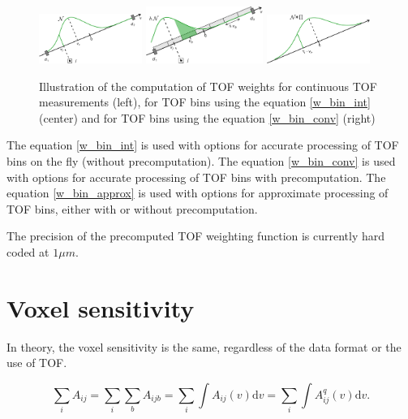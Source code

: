 \documentclass[a4paper, 11pt]{article}
\begin{document}
\begin{figure}[!htb]
\centering
\includegraphics[width=0.3\textwidth]{figures/tof_weights_illustr1.pdf}
\includegraphics[width=0.34\textwidth]{figures/tof_weights_illustr2.pdf}
\includegraphics[width=0.3\textwidth]{figures/tof_weights_illustr3.pdf}
\caption{Illustration of the computation of TOF weights for continuous TOF measurements (left), for TOF bins using the equation \ref{w_bin_int} (center) and for TOF bins using the equation \ref{w_bin_conv} (right)}
\label{illustr_var}
\end{figure}

The equation \ref{w_bin_int} is used with options for accurate processing of TOF bins on the fly (without precomputation). The equation \ref{w_bin_conv} is used with options for accurate processing of TOF bins with precomputation. The equation \ref{w_bin_approx} is used with options for approximate processing of TOF bins, either with or without precomputation.

The precision of the precomputed TOF weighting function is currently hard coded at $1\mu m$.

\section{Voxel sensitivity}

In theory, the voxel sensitivity is the same, regardless of the data format or the use of TOF.

\begin{equation}
\label{sens}
\sum_i A_{ij} = \sum_i\sum_b A_{ijb} = \sum_i \int{A_{ij}(v)\mathrm{d}v} = \sum_i \int{A^q_{ij}(v)\mathrm{d}v}.
\end{equation}
\end{document}
